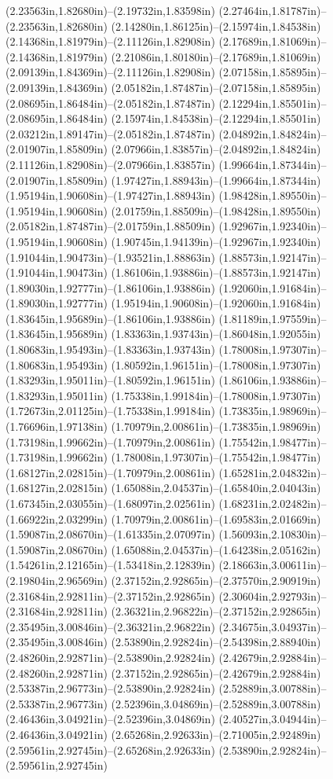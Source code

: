 (2.23563in,1.82680in)--(2.19732in,1.83598in) (2.27464in,1.81787in)--(2.23563in,1.82680in) (2.14280in,1.86125in)--(2.15974in,1.84538in) (2.14368in,1.81979in)--(2.11126in,1.82908in) (2.17689in,1.81069in)--(2.14368in,1.81979in) (2.21086in,1.80180in)--(2.17689in,1.81069in) (2.09139in,1.84369in)--(2.11126in,1.82908in) (2.07158in,1.85895in)--(2.09139in,1.84369in) (2.05182in,1.87487in)--(2.07158in,1.85895in) (2.08695in,1.86484in)--(2.05182in,1.87487in) (2.12294in,1.85501in)--(2.08695in,1.86484in) (2.15974in,1.84538in)--(2.12294in,1.85501in) (2.03212in,1.89147in)--(2.05182in,1.87487in) (2.04892in,1.84824in)--(2.01907in,1.85809in) (2.07966in,1.83857in)--(2.04892in,1.84824in) (2.11126in,1.82908in)--(2.07966in,1.83857in) (1.99664in,1.87344in)--(2.01907in,1.85809in) (1.97427in,1.88943in)--(1.99664in,1.87344in) (1.95194in,1.90608in)--(1.97427in,1.88943in) (1.98428in,1.89550in)--(1.95194in,1.90608in) (2.01759in,1.88509in)--(1.98428in,1.89550in) (2.05182in,1.87487in)--(2.01759in,1.88509in) (1.92967in,1.92340in)--(1.95194in,1.90608in) (1.90745in,1.94139in)--(1.92967in,1.92340in) (1.91044in,1.90473in)--(1.93521in,1.88863in) (1.88573in,1.92147in)--(1.91044in,1.90473in) (1.86106in,1.93886in)--(1.88573in,1.92147in) (1.89030in,1.92777in)--(1.86106in,1.93886in) (1.92060in,1.91684in)--(1.89030in,1.92777in) (1.95194in,1.90608in)--(1.92060in,1.91684in) (1.83645in,1.95689in)--(1.86106in,1.93886in) (1.81189in,1.97559in)--(1.83645in,1.95689in) (1.83363in,1.93743in)--(1.86048in,1.92055in) (1.80683in,1.95493in)--(1.83363in,1.93743in) (1.78008in,1.97307in)--(1.80683in,1.95493in) (1.80592in,1.96151in)--(1.78008in,1.97307in) (1.83293in,1.95011in)--(1.80592in,1.96151in) (1.86106in,1.93886in)--(1.83293in,1.95011in) (1.75338in,1.99184in)--(1.78008in,1.97307in) (1.72673in,2.01125in)--(1.75338in,1.99184in) (1.73835in,1.98969in)--(1.76696in,1.97138in) (1.70979in,2.00861in)--(1.73835in,1.98969in) (1.73198in,1.99662in)--(1.70979in,2.00861in) (1.75542in,1.98477in)--(1.73198in,1.99662in) (1.78008in,1.97307in)--(1.75542in,1.98477in) (1.68127in,2.02815in)--(1.70979in,2.00861in) (1.65281in,2.04832in)--(1.68127in,2.02815in) (1.65088in,2.04537in)--(1.65840in,2.04043in) (1.67345in,2.03055in)--(1.68097in,2.02561in) (1.68231in,2.02482in)--(1.66922in,2.03299in) (1.70979in,2.00861in)--(1.69583in,2.01669in) (1.59087in,2.08670in)--(1.61335in,2.07097in) (1.56093in,2.10830in)--(1.59087in,2.08670in) (1.65088in,2.04537in)--(1.64238in,2.05162in) (1.54261in,2.12165in)--(1.53418in,2.12839in) (2.18663in,3.00611in)--(2.19804in,2.96569in) (2.37152in,2.92865in)--(2.37570in,2.90919in) (2.31684in,2.92811in)--(2.37152in,2.92865in) (2.30604in,2.92793in)--(2.31684in,2.92811in) (2.36321in,2.96822in)--(2.37152in,2.92865in) (2.35495in,3.00846in)--(2.36321in,2.96822in) (2.34675in,3.04937in)--(2.35495in,3.00846in) (2.53890in,2.92824in)--(2.54398in,2.88940in) (2.48260in,2.92871in)--(2.53890in,2.92824in) (2.42679in,2.92884in)--(2.48260in,2.92871in) (2.37152in,2.92865in)--(2.42679in,2.92884in) (2.53387in,2.96773in)--(2.53890in,2.92824in) (2.52889in,3.00788in)--(2.53387in,2.96773in) (2.52396in,3.04869in)--(2.52889in,3.00788in) (2.46436in,3.04921in)--(2.52396in,3.04869in) (2.40527in,3.04944in)--(2.46436in,3.04921in) (2.65268in,2.92633in)--(2.71005in,2.92489in) (2.59561in,2.92745in)--(2.65268in,2.92633in) (2.53890in,2.92824in)--(2.59561in,2.92745in) 